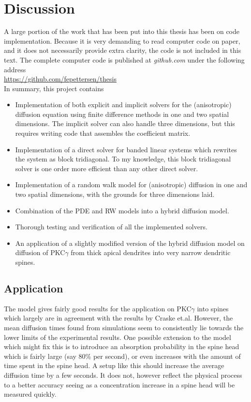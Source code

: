 \section{Discussion}

A large portion of the work that has been put into this thesis has been on code implementation. 
Because it is very demanding to read computer code on paper, and it does not necessarily provide extra clarity, the code is not included in this text. 
The complete computer code is published at \emph{github.com} under the following address \\

\noindent\url{https://github.com/fepettersen/thesis} \\

In summary, this project contains
\begin{itemize}
 \item Implementation of both explicit and implicit solvers for the (anisotropic) diffusion equation using finite difference methods in one and two spatial dimensions. The implicit solver can also handle three dimensions, but this requires writing code that assembles the coefficient matrix.
 \item Implementation of a direct solver for banded linear systems which rewrites the system as block tridiagonal. To my knowledge, this block tridiagonal solver is one order more efficient than any other direct solver.
 \item Implementation of a random walk model for (anisotropic) diffusion in one and two spatial dimensions, with the grounds for three dimensions laid.
 \item Combination of the PDE and RW models into a hybrid diffusion model. 
 \item Thorough testing and verification of all the implemented solvers.
 \item An application of a slightly modified version of the hybrid diffusion model on diffusion of PKC$\gamma$ from thick apical dendrites into very narrow dendritic spines.
\end{itemize}

\subsection{Application}

The model gives fairly good results for the application on PKC$\gamma$ into spines which largely are in agreement with the results by Craske et.al. 
However, the mean diffusion times found from simulations seem to consistently lie towards the lower limits of the experimental results. 
One possible extension to the model which might fix this is to introduce an absorption probability in the spine head which is fairly large (say 80\% per second), or even increases with the amount of time spent in the spine head. 
A setup like this should increase the average diffusion time by a few seconds. 
It does not, however reflect the physical process to a better accuracy seeing as a concentration increase in a spine head will be measured quickly.

